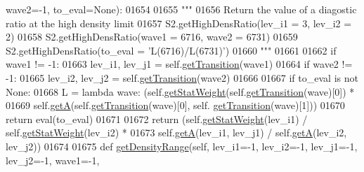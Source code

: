 \begin{DoxyCode}
{{      wave2=-1, to\_eval=None):
01654         
01655         \textcolor{stringliteral}{"""}
01656 \textcolor{stringliteral}{        Return the value of a diagostic ratio at the high density limit}
01657 \textcolor{stringliteral}{        S2.getHighDensRatio(lev\_i1 = 3, lev\_i2 = 2)}
01658 \textcolor{stringliteral}{        S2.getHighDensRatio(wave1 = 6716, wave2 = 6731)}
01659 \textcolor{stringliteral}{        S2.getHighDensRatio(to\_eval = 'L(6716)/L(6731)')}
01660 \textcolor{stringliteral}{        """}
01661         
01662         \textcolor{keywordflow}{if} wave1 != -1:
01663             lev\_i1, lev\_j1 = self.\hyperlink{classpyneb_1_1core_1_1pynebcore_1_1_atom_a7c9f17a3d9e841267add92377d9d1ede}{getTransition}(wave1)
01664         \textcolor{keywordflow}{if} wave2 != -1:
01665             lev\_i2, lev\_j2 = self.\hyperlink{classpyneb_1_1core_1_1pynebcore_1_1_atom_a7c9f17a3d9e841267add92377d9d1ede}{getTransition}(wave2)
01666             
01667         \textcolor{keywordflow}{if} to\_eval \textcolor{keywordflow}{is} \textcolor{keywordflow}{not} \textcolor{keywordtype}{None}:
01668             L = \textcolor{keyword}{lambda} wave: (self.\hyperlink{classpyneb_1_1core_1_1pynebcore_1_1_atom_a0f2483487115f19556586b9e422bd5fb}{getStatWeight}(self.\hyperlink{classpyneb_1_1core_1_1pynebcore_1_1_atom_a7c9f17a3d9e841267add92377d9d1ede}{getTransition}(wave)[0]) * 
01669                               self.\hyperlink{classpyneb_1_1core_1_1pynebcore_1_1_atom_a4b3ea50d7c77fdf645c2cea97243c17e}{getA}(self.\hyperlink{classpyneb_1_1core_1_1pynebcore_1_1_atom_a7c9f17a3d9e841267add92377d9d1ede}{getTransition}(wave)[0], self.
      \hyperlink{classpyneb_1_1core_1_1pynebcore_1_1_atom_a7c9f17a3d9e841267add92377d9d1ede}{getTransition}(wave)[1]))
01670             \textcolor{keywordflow}{return} eval(to\_eval)
01671             
01672         \textcolor{keywordflow}{return} (self.\hyperlink{classpyneb_1_1core_1_1pynebcore_1_1_atom_a0f2483487115f19556586b9e422bd5fb}{getStatWeight}(lev\_i1) / self.\hyperlink{classpyneb_1_1core_1_1pynebcore_1_1_atom_a0f2483487115f19556586b9e422bd5fb}{getStatWeight}(lev\_i2) *
01673                 self.\hyperlink{classpyneb_1_1core_1_1pynebcore_1_1_atom_a4b3ea50d7c77fdf645c2cea97243c17e}{getA}(lev\_i1, lev\_j1) / self.\hyperlink{classpyneb_1_1core_1_1pynebcore_1_1_atom_a4b3ea50d7c77fdf645c2cea97243c17e}{getA}(lev\_i2, lev\_j2))
01674            
01675     \textcolor{keyword}{def }\hyperlink{classpyneb_1_1core_1_1pynebcore_1_1_atom_a30ea60641df87c5eaf8af392d31da920}{getDensityRange}(self, lev\_i1=-1, lev\_i2=-1, lev\_j1=-1, lev\_j2=-1, wave1=-1, 
}}
\end{DoxyCode}
